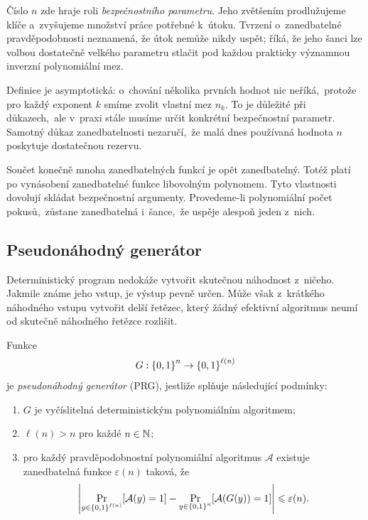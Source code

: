 Číslo $n$ zde hraje roli \emph{bezpečnostního parametru}. Jeho zvětšením prodlužujeme klíče a~zvyšujeme množství práce potřebné k~útoku. Tvrzení o~zanedbatelné pravděpodobnosti neznamená, že útok nemůže nikdy uspět; říká, že jeho šanci lze volbou dostatečně velkého parametru stlačit pod každou prakticky významnou inverzní polynomiální mez.

Definice je asymptotická: o~chování několika prvních hodnot nic neříká,~protože pro každý exponent $k$ smíme zvolit vlastní mez $n_k$. To je důležité při důkazech,~ale v~praxi stále musíme určit konkrétní bezpečnostní parametr. Samotný důkaz zanedbatelnosti nezaručí,~že malá dnes používaná hodnota $n$ poskytuje dostatečnou rezervu.

Součet konečně mnoha zanedbatelných funkcí je opět zanedbatelný. Totéž platí po vynásobení zanedbatelné funkce libovolným polynomem. Tyto vlastnosti dovolují skládat bezpečnostní argumenty. Provedeme-li polynomiální počet pokusů,~zůstane zanedbatelná i~šance,~že uspěje alespoň jeden z~nich.

\subsection{Pseudonáhodný generátor}

Deterministický program nedokáže vytvořit skutečnou náhodnost z~ničeho. Jakmile známe jeho vstup, je výstup pevně určen. Může však z~krátkého náhodného vstupu vytvořit delší řetězec, který žádný efektivní algoritmus neumí od skutečně náhodného řetězce rozlišit.

\begin{definition}\label{def:krypto-prg}
    Funkce
    \[
        G:\left\{0,1\right\}^{n} \rightarrow \left\{0,1\right\}^{\ell(n)}
    \]
    je \emph{pseudonáhodný generátor} (PRG), jestliže splňuje následující podmínky:
    \begin{enumerate}
        \item $G$ je vyčíslitelná deterministickým polynomiálním algoritmem;
        \item $\ell(n)>n$ pro každé $n\in\mathbb{N}$;
        \item pro každý pravděpodobnostní polynomiální algoritmus $\mathcal A$ existuje zanedbatelná funkce $\varepsilon(n)$ taková, že
        \[
            \left|
            \Pr_{y\in\left\{0,1\right\}^{\ell(n)}}[\mathcal A(y)=1]
            -
            \Pr_{y\in\left\{0,1\right\}^{n}}[\mathcal A(G(y))=1]
            \right|
            \leqslant\varepsilon(n).
        \]
    \end{enumerate}
\end{definition}

